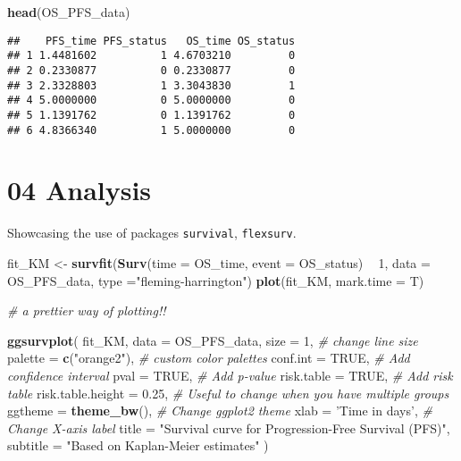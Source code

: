\documentclass[
]{article}
\newenvironment{Shaded}{\begin{snugshade}}{\end{snugshade}}
\newcommand{\CommentTok}[1]{\textcolor[rgb]{0.56,0.35,0.01}{\textit{#1}}}
\newcommand{\DataTypeTok}[1]{\textcolor[rgb]{0.13,0.29,0.53}{#1}}
\newcommand{\DecValTok}[1]{\textcolor[rgb]{0.00,0.00,0.81}{#1}}
\newcommand{\FloatTok}[1]{\textcolor[rgb]{0.00,0.00,0.81}{#1}}
\newcommand{\KeywordTok}[1]{\textcolor[rgb]{0.13,0.29,0.53}{\textbf{#1}}}
\newcommand{\NormalTok}[1]{#1}
\newcommand{\OperatorTok}[1]{\textcolor[rgb]{0.81,0.36,0.00}{\textbf{#1}}}
\newcommand{\OtherTok}[1]{\textcolor[rgb]{0.56,0.35,0.01}{#1}}
\newcommand{\StringTok}[1]{\textcolor[rgb]{0.31,0.60,0.02}{#1}}
\begin{document}
\begin{Shaded}
\begin{Highlighting}[]
\KeywordTok{head}\NormalTok{(OS_PFS_data)}
\end{Highlighting}
\end{Shaded}

\begin{verbatim}
##    PFS_time PFS_status   OS_time OS_status
## 1 1.4481602          1 4.6703210         0
## 2 0.2330877          0 0.2330877         0
## 3 2.3328803          1 3.3043830         1
## 4 5.0000000          0 5.0000000         0
## 5 1.1391762          0 1.1391762         0
## 6 4.8366340          1 5.0000000         0
\end{verbatim}

\hypertarget{analysis}{%
\section{04 Analysis}\label{analysis}}

Showcasing the use of packages \texttt{survival}, \texttt{flexsurv}.

\begin{Shaded}
\begin{Highlighting}[]
\NormalTok{fit_KM   <-}\StringTok{ }\KeywordTok{survfit}\NormalTok{(}\KeywordTok{Surv}\NormalTok{(}\DataTypeTok{time =}\NormalTok{ OS_time, }\DataTypeTok{event =}\NormalTok{ OS_status) }\OperatorTok{~}\StringTok{ }\DecValTok{1}\NormalTok{, }\DataTypeTok{data =}\NormalTok{ OS_PFS_data, }
                         \DataTypeTok{type =}\StringTok{"fleming-harrington"}\NormalTok{)}
\KeywordTok{plot}\NormalTok{(fit_KM, }\DataTypeTok{mark.time =}\NormalTok{ T)}


\CommentTok{# a prettier way of plotting!!}

\KeywordTok{ggsurvplot}\NormalTok{(}
\NormalTok{  fit_KM, }
  \DataTypeTok{data =}\NormalTok{ OS_PFS_data, }
  \DataTypeTok{size =} \DecValTok{1}\NormalTok{,                  }\CommentTok{# change line size}
  \DataTypeTok{palette =} \KeywordTok{c}\NormalTok{(}\StringTok{"orange2"}\NormalTok{),    }\CommentTok{# custom color palettes}
  \DataTypeTok{conf.int =} \OtherTok{TRUE}\NormalTok{,           }\CommentTok{# Add confidence interval}
  \DataTypeTok{pval =} \OtherTok{TRUE}\NormalTok{,               }\CommentTok{# Add p-value}
  \DataTypeTok{risk.table =} \OtherTok{TRUE}\NormalTok{,         }\CommentTok{# Add risk table}
  \DataTypeTok{risk.table.height =} \FloatTok{0.25}\NormalTok{,  }\CommentTok{# Useful to change when you have multiple groups}
  \DataTypeTok{ggtheme =} \KeywordTok{theme_bw}\NormalTok{(),      }\CommentTok{# Change ggplot2 theme}
  \DataTypeTok{xlab =} \StringTok{'Time in days'}\NormalTok{,     }\CommentTok{# Change X-axis label}
  \DataTypeTok{title    =} \StringTok{"Survival curve for Progression-Free Survival (PFS)"}\NormalTok{, }
  \DataTypeTok{subtitle =} \StringTok{"Based on Kaplan-Meier estimates"}
\NormalTok{) }
\end{Highlighting}
\end{Shaded}
\end{document}
